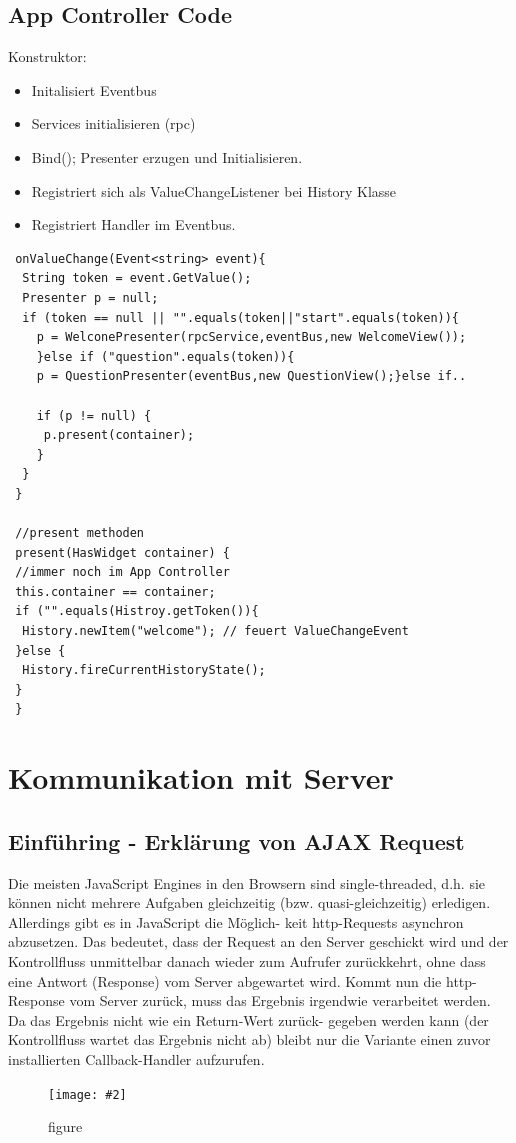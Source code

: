 \documentclass[a4paper,10pt]{scrreprt}
\newcommand{\pic}[2][figure]{\begin{figure}[h]
 \centering
 \texttt{[image: \#2]}
 \caption{#1}
\end{figure}
}
\begin{document}
\section{App Controller Code}

Konstruktor: \\
\begin{itemize}
 \item Initalisiert Eventbus
 \item Services initialisieren (rpc)
 \item Bind();
 \subitem Presenter erzugen und Initialisieren.
 \item Registriert sich als ValueChangeListener bei History Klasse
 \item Registriert Handler im Eventbus.
\end{itemize}

\begin{lstlisting}
 onValueChange(Event<string> event){
  String token = event.GetValue();
  Presenter p = null;
  if (token == null || "".equals(token||"start".equals(token)){
    p = WelconePresenter(rpcService,eventBus,new WelcomeView());
    }else if ("question".equals(token)){
    p = QuestionPresenter(eventBus,new QuestionView();}else if..
    
    if (p != null) {
     p.present(container);
    }
  }
 }
 
 //present methoden
 present(HasWidget container) {
 //immer noch im App Controller
 this.container == container;
 if ("".equals(Histroy.getToken()){
  History.newItem("welcome"); // feuert ValueChangeEvent
 }else {
  History.fireCurrentHistoryState();
 }
 }
\end{lstlisting}


\chapter{Kommunikation mit Server}
\section{Einführing - Erklärung von AJAX Request}
Die meisten JavaScript Engines in den Browsern sind single-threaded, d.h. sie können nicht mehrere
Aufgaben gleichzeitig (bzw. quasi-gleichzeitig) erledigen. Allerdings gibt es in JavaScript die Möglich-
keit http-Requests asynchron abzusetzen. Das bedeutet, dass der Request an den Server geschickt
wird und der Kontrollfluss unmittelbar danach wieder zum Aufrufer zurückkehrt, ohne dass eine
Antwort (Response) vom Server abgewartet wird. Kommt nun die http-Response vom Server zurück,
muss das Ergebnis irgendwie verarbeitet werden. Da das Ergebnis nicht wie ein Return-Wert zurück-
gegeben werden kann (der Kontrollfluss wartet das Ergebnis nicht ab) bleibt nur die Variante einen
zuvor installierten Callback-Handler aufzurufen.
\pic{ajax.png}
\end{document}
